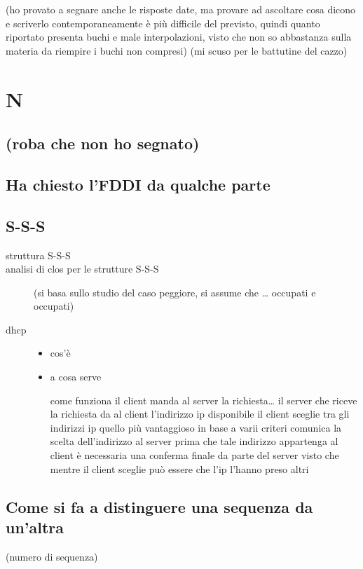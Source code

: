 \documentclass[11pt]{article}
\author{Biggie Dickus}
\date{\today}
\title{}
\begin{document}
\tableofcontents

(ho provato a segnare anche le risposte date, ma provare ad ascoltare cosa dicono e scriverlo contemporaneamente è più difficile del previsto, quindi quanto riportato presenta buchi e male interpolazioni, visto che non so abbastanza sulla materia da riempire i buchi non compresi)
(mi scuso per le battutine del cazzo)
\section{N}
\label{sec:orgb0a56ea}
\subsection{(roba che non ho segnato)}
\label{sec:org0e64073}
\subsection{Ha chiesto l'FDDI da qualche parte}
\label{sec:orgd771a8f}
\subsection{S-S-S}
\label{sec:org974e669}
\begin{description}
\item[{struttura S-S-S}] 

\item[{analisi di clos per le strutture S-S-S}] (si basa sullo studio del caso peggiore, si assume che \ldots{} occupati e occupati)
\item[{dhcp}] \begin{itemize}
\item cos'è
\item a cosa serve
\item[{come funziona}] il client manda al server la richiesta\ldots{}
il server che riceve la richiesta da al client l'indirizzo ip disponibile
il client sceglie tra gli indirizzi ip quello più vantaggioso in base a varii criteri
comunica la scelta dell'indirizzo al server
prima che tale indirizzo appartenga al client è necessaria una conferma finale da parte del server visto che mentre il client sceglie può essere che l'ip l'hanno preso altri
\end{itemize}
\end{description}

\subsection{Come si fa a distinguere una sequenza da un'altra}
\label{sec:org1d6e7ae}
(numero di sequenza)
\end{document}
